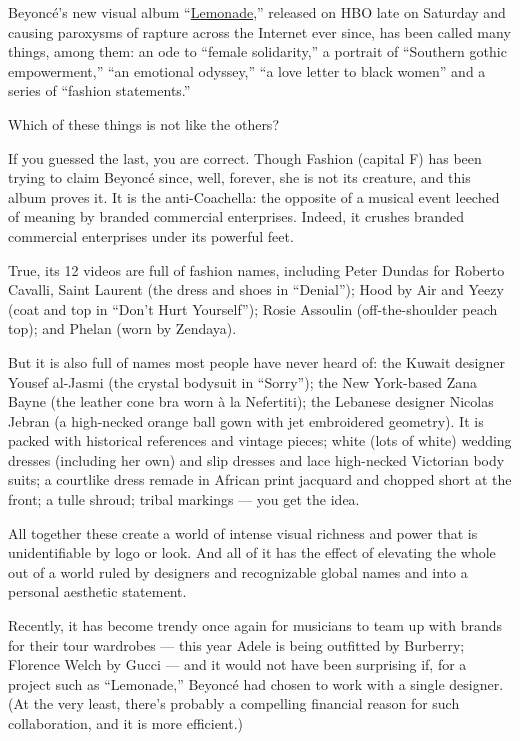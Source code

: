Beyoncé's new visual album
``\href{http://www.nytimes.com/2016/04/25/arts/music/beyonce-unearths-pain-and-lets-it-flow-in-lemonade.html}{Lemonade},''
released on HBO late on Saturday and causing paroxysms of rapture across
the Internet ever since, has been called many things, among them: an ode
to ``female solidarity,'' a portrait of ``Southern gothic empowerment,''
``an emotional odyssey,'' ``a love letter to black women'' and a series
of ``fashion statements.''

Which of these things is not like the others?

If you guessed the last, you are correct. Though Fashion (capital F) has
been trying to claim Beyoncé since, well, forever, she is not its
creature, and this album proves it. It is the anti-Coachella: the
opposite of a musical event leeched of meaning by branded commercial
enterprises. Indeed, it crushes branded commercial enterprises under its
powerful feet.

True, its 12 videos are full of fashion names, including Peter Dundas
for Roberto Cavalli, Saint Laurent (the dress and shoes in ``Denial'');
Hood by Air and Yeezy (coat and top in ``Don't Hurt Yourself''); Rosie
Assoulin (off-the-shoulder peach top); and Phelan (worn by Zendaya).

But it is also full of names most people have never heard of: the Kuwait
designer Yousef al-Jasmi (the crystal bodysuit in ``Sorry''); the New
York-based Zana Bayne (the leather cone bra worn à la Nefertiti); the
Lebanese designer Nicolas Jebran (a high-necked orange ball gown with
jet embroidered geometry). It is packed with historical references and
vintage pieces; white (lots of white) wedding dresses (including her
own) and slip dresses and lace high-necked Victorian body suits; a
courtlike dress remade in African print jacquard and chopped short at
the front; a tulle shroud; tribal markings --- you get the idea.

All together these create a world of intense visual richness and power
that is unidentifiable by logo or look. And all of it has the effect of
elevating the whole out of a world ruled by designers and recognizable
global names and into a personal aesthetic statement.

Recently, it has become trendy once again for musicians to team up with
brands for their tour wardrobes --- this year Adele is being outfitted
by Burberry; Florence Welch by Gucci --- and it would not have been
surprising if, for a project such as ``Lemonade,'' Beyoncé had chosen to
work with a single designer. (At the very least, there's probably a
compelling financial reason for such collaboration, and it is more
efficient.)

